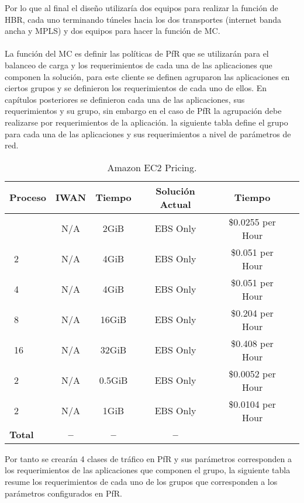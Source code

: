 Por lo que al final el diseño utilizaría dos equipos para realizar la función de HBR, cada uno terminando túneles hacia los dos transportes (internet banda ancha y MPLS) y dos equipos para hacer la función de MC.
\\
\\
La función del MC es definir las políticas de PfR que se utilizarán para el balanceo de carga y los requerimientos de cada una de las aplicaciones que componen la solución, para este cliente se definen agruparon las aplicaciones en ciertos grupos y se definieron los requerimientos de cada uno de ellos. En capítulos posteriores se definieron cada una de las aplicaciones, sus requerimientos y su grupo, sin embargo en el caso de PfR la agrupación debe realizarse por requerimientos de la aplicación. la siguiente tabla define el grupo para cada una de las aplicaciones y sus requerimientos a nivel de parámetros de red.
\begin{table}[ht]
	\caption{Amazon EC2 Pricing.}
	\label{tab:hla:results}
\centering
\begin{tabular}{lccccc}
	\toprule
	\multicolumn{1}{c}{\textbf{Proceso}} 	& \textbf{IWAN}	& \textbf{Tiempo}	& \textbf{Solución Actual}
	& \textbf{Tiempo}\\
	\midrule
\cite{Aprovisionamiento tienda nueva} 		& N/A & 2GiB & EBS Only	& \$0.0255 per Hour \\
\cite{a1.large}~2 		& N/A & 4GiB & EBS Only & \$0.051 per Hour	\\
\cite{a1.xlarge}~4		& N/A & 4GiB & EBS Only & \$0.051 per Hour	\\
\cite{a1.2xlarge}~8 	& N/A & 16GiB & EBS Only & \$0.204 per Hour	\\
\cite{a1.4xlarge}~16	& N/A & 32GiB & EBS Only & \$0.408 per Hour	\\
\cite{t3.nano}~2		& N/A & 0.5GiB & EBS Only & \$0.0052 per Hour	\\
\cite{t3.micro}~2   	& N/A & 1GiB & EBS Only & \$0.0104 per Hour	\\
	\midrule
	\textbf{Total}			& \textbf{--}		& \textbf{--}		& \textbf{--} \\
	\bottomrule
\end{tabular}
\end{table}
Por tanto se crearán 4 clases de tráfico en PfR y sus parámetros corresponden a los requerimientos de las aplicaciones que componen el grupo, la siguiente tabla resume los requerimientos de cada uno de los grupos que corresponden a los parámetros configurados en PfR.
